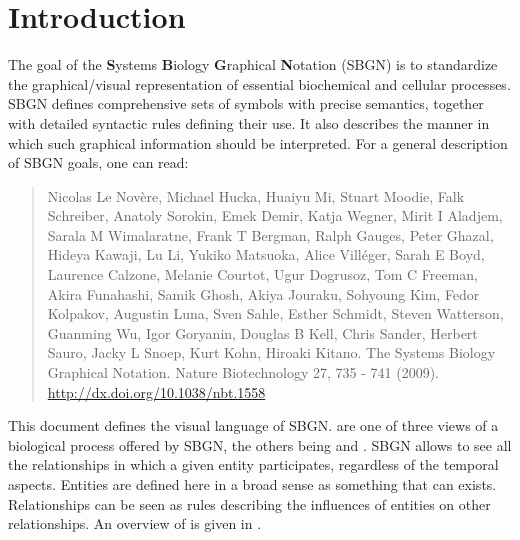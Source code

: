 
\chapter{Introduction}

The goal of the \textbf{S}ystems \textbf{B}iology \textbf{G}raphical \textbf{N}otation (SBGN) is to standardize the graphical/visual representation of essential biochemical and cellular processes. SBGN defines comprehensive sets of symbols with precise semantics, together with detailed syntactic rules defining their use.  It also describes the manner in which such graphical information should be interpreted. For a general description of SBGN goals, one can read:

\begin{quote}
 Nicolas Le Nov\`{e}re, Michael Hucka, Huaiyu Mi, Stuart Moodie, Falk Schreiber, Anatoly Sorokin, Emek Demir, Katja Wegner, Mirit I Aladjem, Sarala M Wimalaratne, Frank T Bergman, Ralph Gauges, Peter Ghazal, Hideya Kawaji, Lu Li, Yukiko Matsuoka, Alice Villéger, Sarah E Boyd, Laurence Calzone, Melanie Courtot, Ugur Dogrusoz, Tom C Freeman, Akira Funahashi, Samik Ghosh, Akiya Jouraku, Sohyoung Kim, Fedor Kolpakov, Augustin Luna, Sven Sahle, Esther Schmidt, Steven Watterson, Guanming Wu, Igor Goryanin, Douglas B Kell, Chris Sander, Herbert Sauro, Jacky L Snoep, Kurt Kohn, Hiroaki Kitano. The Systems Biology Graphical Notation. Nature Biotechnology 27, 735 - 741 (2009).  \url{http://dx.doi.org/10.1038/nbt.1558}
\end{quote}

This document defines the \emph{\ER{}} visual language of SBGN. \ERs are one of three views of a biological process offered by SBGN, the others being \PDs and \AFs. SBGN \ERl{} allows to see all the relationships in which a given entity participates, regardless of the temporal aspects. Entities are defined here in a broad sense as something that can exists. Relationships can be seen as rules describing the influences of entities on other relationships. An overview of \ERs is given in .





